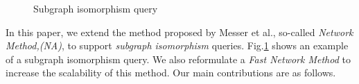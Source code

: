 



\begin{figure}
\centering

\caption{Subgraph isomorphism query}
\label{fig:fig11}
\end{figure}



In this paper, we extend the method proposed by Messer et al.\cite{messmer_bunke2000}, so-called \textit{Network Method,(NA)}, to support \textit{subgraph isomorphism} queries.
Fig.\ref{fig:fig11} shows an example of a subgraph isomorphism query. We also reformulate a  \textit{Fast Network Method } to increase the scalability of this method.
Our main contributions are as follows.

